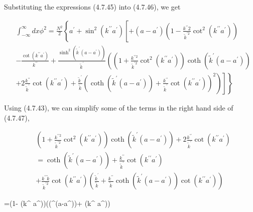 \documentclass{article}
\begin{document}
Substituting the expressions (4.7.45) into (4.7.46), we get
 
\begin{align*}
& \int_{-\infty}^{\infty} d x \phi^{2}=\frac{N^{2}}{2}\left\{a^{\prime}+\sin ^{2}\left(k^{\prime \prime} a^{\prime}\right)\left[+\left(a-a^{\prime}\right)\left(1-\frac{k^{\prime \prime} 2}{\tilde{k}^{\prime 2}} \cot ^{2}\left(k^{\prime \prime} a^{\prime}\right)\right)\right.\right.  \tag{4.7.47}\\
&-\frac{\cot \left(k^{\prime \prime} a^{\prime}\right)}{k^{\prime \prime}}+\frac{\sinh ^{2}\left(\tilde{k}^{\prime}\left(a-a^{\prime}\right)\right)}{\tilde{k}^{\prime}}\left(\left(1+\frac{k^{\prime \prime 2}}{\tilde{k}^{\prime 2}} \cot ^{2}\left(k^{\prime \prime} a^{\prime}\right)\right) \operatorname{coth}\left(\tilde{k}^{\prime}\left(a-a^{\prime}\right)\right)\right. \\
&\left.\left.\left.+2 \frac{k^{\prime \prime}}{\tilde{k}^{\prime}} \cot \left(k^{\prime \prime} a^{\prime}\right)+\frac{\tilde{k}^{\prime}}{\tilde{k}}\left(\operatorname{coth}\left(\tilde{k}^{\prime}\left(a-a^{\prime}\right)\right)+\frac{k^{\prime \prime}}{\tilde{k}^{\prime}} \cot \left(k^{\prime \prime} a^{\prime}\right)\right)^{2}\right)\right]\right\}
\end{align*}
 

Using (4.7.43), we can simplify some of the terms in the right hand side of (4.7.47),
 
\begin{align*}
&\left(1+\frac{k^{\prime \prime 2}}{\tilde{k}^{\prime 2}} \cot ^{2}\left(k^{\prime \prime} a^{\prime}\right)\right) \operatorname{coth}\left(\tilde{k}^{\prime}\left(a-a^{\prime}\right)\right)+2 \frac{k^{\prime \prime}}{\tilde{k}^{\prime}} \cot \left(k^{\prime \prime} a^{\prime}\right)  \tag{4.7.48}\\
&=\operatorname{coth}\left(\tilde{k}^{\prime}\left(a-a^{\prime}\right)\right)+\frac{k^{\prime \prime}}{\tilde{k}^{\prime}} \cot \left(k^{\prime \prime} a^{\prime}\right) \\
&+\frac{k^{\prime \prime} \tilde{k}}{\tilde{k}^{\prime 2}} \cot \left(k^{\prime \prime} a^{\prime}\right)\left(\frac{\tilde{k}^{\prime}}{\tilde{k}}+\frac{k^{\prime \prime}}{\tilde{k}} \operatorname{coth}\left(\tilde{k}^{\prime}\left(a-a^{\prime}\right)\right) \cot \left(k^{\prime \prime} a^{\prime}\right)\right)
\end{align*}
 
 
=\left(1- \cot \left(k^{\prime \prime} a^{\prime}\right)\right)\left(\left(^{\prime}\left(a-a^{\prime}\right)\right)+ \cot \left(k^{\prime \prime} a^{\prime}\right)\right)
 
\end{document}
